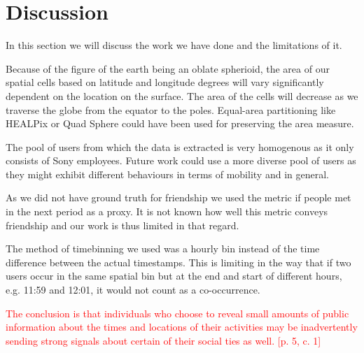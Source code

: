 \chapter{Discussion}
In this section we will discuss the work we have done and the limitations of it.

Because of the figure of the earth being an oblate spherioid, the area of our spatial cells based on latitude and longitude degrees will vary significantly dependent on the location on the surface. The area of the cells will decrease as we traverse the globe from the equator to the poles. Equal-area partitioning like HEALPix or Quad Sphere could have been used for preserving the area measure.

The pool of users from which the data is extracted is very homogenous as it only consists of Sony employees. Future work could use a more diverse pool of users as they might exhibit different behaviours in terms of mobility and in general.

As we did not have ground truth for friendship we used the metric if people met in the next period as a proxy. It is not known how well this metric conveys friendship and our work is thus limited in that regard.

The method of timebinning we used was a hourly bin instead of the time difference between the actual timestamps. This is limiting in the way that if two users occur in the same spatial bin but at the end and start of different hours, e.g. 11:59 and 12:01, it would not count as a co-occurrence.

\textcolor{red}{The conclusion is that individuals who choose to reveal small amounts of public information about the times and locations of their activities may be inadvertently sending strong signals about certain of their social ties as well. [p. 5, c. 1]}